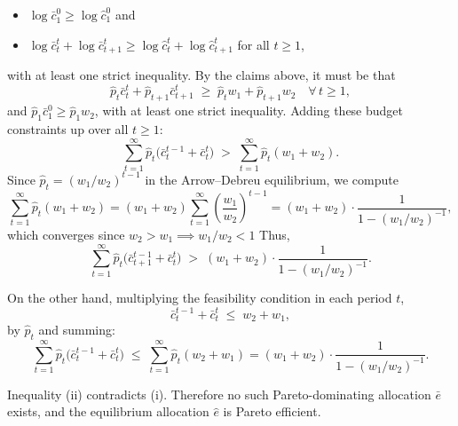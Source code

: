 \documentclass[11pt,english]{article}
\begin{document}
\begin{enumerate}
\begin{solution}
\begin{itemize}
  \item $\log \bar{c}_1^0 \geq \log \hat{c}_1^0$ and
  \item $\log \bar{c}_t^t + \log \bar{c}_{t+1}^t \geq \log \hat{c}_t^t + \log \hat{c}_{t+1}^t$ for all $t \geq 1$,
\end{itemize}
with at least one strict inequality.  By the claims above, it must be that
\[
  \hat{p}_t \bar{c}_t^t + \hat{p}_{t+1} \bar{c}_{t+1}^t
  \;\geq\; \hat{p}_t w_1 + \hat{p}_{t+1} w_2
  \quad \forall\, t \geq 1,
\]
and $\hat{p}_1 \bar{c}_1^0 \geq \hat{p}_1 w_2$, with at least one strict inequality. Adding these budget constraints up over all $t \geq 1$:
\[
  \sum_{t=1}^{\infty} \hat{p}_t \bigl(\bar{c}_{t}^{t-1} + \bar{c}_t^t\bigr)
  \;>\;
  \sum_{t=1}^{\infty} \hat{p}_t (w_1 + w_2).
\]
Since $\hat{p}_t = (w_1/w_2)^{t-1}$ in the Arrow--Debreu equilibrium, we compute
\[
  \sum_{t=1}^{\infty} \hat{p}_t (w_1 + w_2)
  = (w_1 + w_2)\sum_{t=1}^{\infty} \left(\frac{w_1}{w_2}\right)^{t-1}
  = (w_1 + w_2)\cdot\frac{1}{1 - (w_1/w_2)^{-1}},
\]
which converges since $w_2 > w_1 \implies w_1/w_2 < 1$
Thus,
\[
  \sum_{t=1}^{\infty} \hat{p}_t \bigl(\bar{c}_{t+1}^{t-1} + \bar{c}_t^t\bigr)
  \;>\;
  (w_1 + w_2)\cdot \frac{1}{1-(w_1/w_2)^{-1}}.
  \tag{i}
\]
 
On the other hand, multiplying the feasibility condition in each period $t$,
\[
  \bar{c}_{t}^{t-1} + \bar{c}_t^t \;\leq\; w_2 + w_1,
\]
by $\hat{p}_t$ and summing:
\[
  \sum_{t=1}^{\infty} \hat{p}_t \bigl(\bar{c}_{t}^{t-1} + \bar{c}_t^t\bigr)
  \;\leq\;
  \sum_{t=1}^{\infty} \hat{p}_t (w_2 + w_1)
  = (w_1 + w_2)\cdot \frac{1}{1 - (w_1/w_2)^{-1}}.
  \tag{ii}
\]
 
Inequality (ii) contradicts (i).  Therefore no such Pareto-dominating allocation $\bar{e}$ exists, and the equilibrium allocation $\hat{e}$ is Pareto efficient.
    \end{solution}
 

\end{enumerate}
\end{document}
